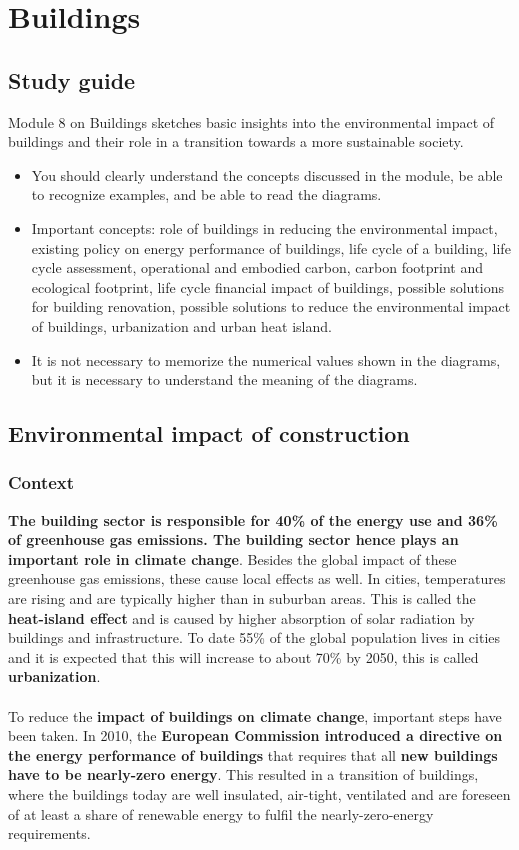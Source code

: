 \documentclass[../summary.tex]{subfiles}
\begin{document}
	
	\section{Buildings}
	
	\subsection{Study guide}
	
	Module 8 on Buildings sketches basic insights into the environmental impact of buildings and their role in a transition towards a more sustainable society. 
	
	\begin{itemize}
		\item You should clearly understand the concepts discussed in the module, be able to recognize examples, and be able to read the diagrams.
		\item Important concepts: role of buildings in reducing the environmental impact, existing policy on energy performance of buildings, life cycle of a building, life cycle assessment, operational and embodied carbon, carbon footprint and ecological footprint, life cycle financial impact of buildings, possible solutions for building renovation, possible solutions to reduce the environmental impact of buildings, urbanization and urban heat island.
		\item It is not necessary to memorize the numerical values shown in the diagrams, but it is necessary to understand the meaning of the diagrams.
	\end{itemize}
	
	\subsection{Environmental impact of construction}
	\subsubsection{Context}
	
	\textbf{The building sector is responsible for 40\% of the energy use and 36\% of greenhouse gas emissions. The building sector hence plays an important role in climate change}. Besides the global impact of these greenhouse gas emissions, these cause local effects as well. In cities, temperatures are rising and are typically higher than in suburban areas. This is called the \textbf{heat-island effect} and is caused by higher absorption of solar radiation by buildings and infrastructure. To date 55\% of the global population lives in cities and it is expected that this will increase to about 70\% by 2050, this is called \textbf{urbanization}.
	\\\\	
	To reduce the \textbf{impact of buildings on climate change}, important steps have been taken. In 2010, the \textbf{European Commission introduced a directive on the energy performance of buildings} that requires that all \textbf{new buildings have to be nearly-zero energy}. This resulted in a transition of buildings, where the buildings today are well insulated, air-tight, ventilated and are foreseen of at least a share of renewable energy to fulfil the nearly-zero-energy requirements. 
	
\end{document}
